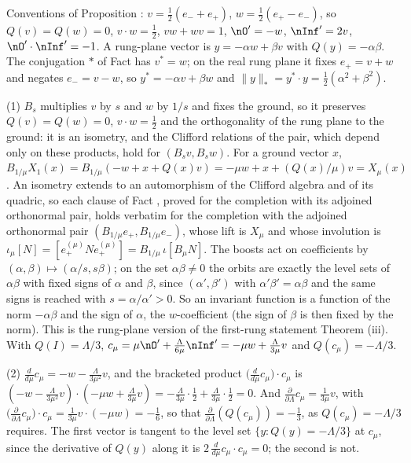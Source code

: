 Conventions of Proposition : $v = \tfrac12(e_{-} + e_{+})$, $w = \tfrac12(e_{+} - e_{-})$, so $Q(v) = Q(w) = 0$, $v\cdot w = \tfrac12$, $vw + wv = 1$, $\nO' = -w$, $\nInf' = 2v$, $\nO'\cdot\nInf' = -1$. A rung-plane vector is $y = -\alpha w + \beta v$ with $Q(y) = -\alpha\beta$. The conjugation $*$ of Fact  has $v^{*} = w$; on the real rung plane it fixes $e_{+} = v + w$ and negates $e_{-} = v - w$, so $y^{*} = -\alpha v + \beta w$ and $\|y\|_{*} = y^{*}\cdot y = \tfrac12(\alpha^{2} + \beta^{2})$.

(1) $B_{s}$ multiplies $v$ by $s$ and $w$ by $1/s$ and fixes the ground, so it preserves $Q(v) = Q(w) = 0$, $v\cdot w = \tfrac12$ and the orthogonality of the rung plane to the ground: it is an isometry, and the Clifford relations of the pair, which depend only on these products, hold for $(B_{s}v, B_{s}w)$. For a ground vector $x$, $B_{1/\mu}X_{1}(x) = B_{1/\mu}(-w + x + Q(x)v) = -\mu w + x + (Q(x)/\mu)v = X_{\mu}(x)$. An isometry extends to an automorphism of the Clifford algebra and of its quadric, so each clause of Fact , proved for the completion with its adjoined orthonormal pair, holds verbatim for the completion with the adjoined orthonormal pair $(B_{1/\mu}e_{+}, B_{1/\mu}e_{-})$, whose lift is $X_{\mu}$ and whose involution is $\iota_{\mu}[N] = [e_{+}^{(\mu)}Ne_{+}^{(\mu)}] = B_{1/\mu}\,\iota[B_{\mu}N]$. The boosts act on coefficients by $(\alpha, \beta) \mapsto (\alpha/s, s\beta)$; on the set $\alpha\beta \ne 0$ the orbits are exactly the level sets of $\alpha\beta$ with fixed signs of $\alpha$ and $\beta$, since $(\alpha', \beta')$ with $\alpha'\beta' = \alpha\beta$ and the same signs is reached with $s = \alpha/\alpha' > 0$. So an invariant function is a function of the norm $-\alpha\beta$ and the sign of $\alpha$, the $w$-coefficient (the sign of $\beta$ is then fixed by the norm). This is the rung-plane version of the first-rung statement Theorem (iii). With $Q(I) = \Lambda/3$, $c_{\mu} = \mu\nO' + \tfrac{\Lambda}{6\mu}\nInf' = -\mu w + \tfrac{\Lambda}{3\mu}v$ and $Q(c_{\mu}) = -\Lambda/3$.

(2) $\tfrac{d}{d\mu}c_{\mu} = -w - \tfrac{\Lambda}{3\mu^{2}}v$, and the bracketed product $\bigl(\tfrac{d}{d\mu}c_{\mu}\bigr)\cdot c_{\mu}$ is $(-w - \tfrac{\Lambda}{3\mu^{2}}v)\cdot(-\mu w + \tfrac{\Lambda}{3\mu}v) = -\tfrac{\Lambda}{3\mu}\cdot\tfrac12 + \tfrac{\Lambda}{3\mu}\cdot\tfrac12 = 0$. And $\tfrac{\partial}{\partial\Lambda}c_{\mu} = \tfrac{1}{3\mu}v$, with $\bigl(\tfrac{\partial}{\partial\Lambda}c_{\mu}\bigr)\cdot c_{\mu} = \tfrac{1}{3\mu}v\cdot(-\mu w) = -\tfrac16$, so that $\tfrac{\partial}{\partial\Lambda}(Q(c_{\mu})) = -\tfrac13$, as $Q(c_{\mu}) = -\Lambda/3$ requires. The first vector is tangent to the level set $\{y : Q(y) = -\Lambda/3\}$ at $c_{\mu}$, since the derivative of $Q(y)$ along it is $2\,\tfrac{d}{d\mu}c_{\mu}\cdot c_{\mu} = 0$; the second is not.

